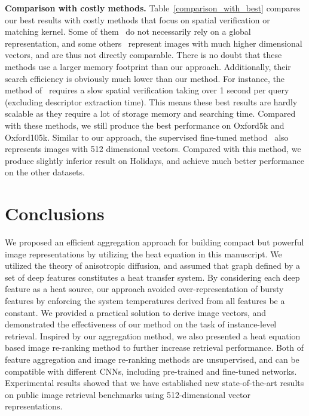 \documentclass[journal]{IEEEtran}
\begin{document}
\vspace{0.01in}
\textbf{Comparison with costly methods.}
Table~\ref{comparison_with_best} compares our best results
with costly methods that focus on spatial verification or matching kernel.
Some of them~\cite{iscen2017efficient,iscen2017fast,noh2017largescale} do not necessarily rely on a
global representation, and some others~\cite{mikulik2013learning,tolias2013aggregate,tolias2015visual, arandjelovic2016netvlad,hoang2017selective} represent images with much higher dimensional vectors, and are thus not directly comparable.
There is no doubt that these methods use a larger memory footprint than our approach.
Additionally, their search efficiency is obviously  much lower than our method.
For instance, the method of~\cite{tolias2015visual} requires a slow spatial verification taking over 1
second per query (excluding descriptor extraction time). This means these best results are  hardly scalable as they require a lot of storage memory and searching time.
Compared with these methods, we still produce the best performance on Oxford5k and Oxford105k.
Similar to our approach, the supervised fine-tuned method~\cite{gordo2016deep} also represents images with 512 dimensional vectors.
Compared with this method, we produce slightly inferior result on Holidays, and achieve much better performance on the other datasets.

\section{Conclusions}\label{sec:conclusions}
We proposed an efficient aggregation approach for building compact but powerful image representations by utilizing the heat equation in this manuscript.
We utilized the theory of anisotropic diffusion, and assumed that graph defined by a set of deep features constitutes a heat transfer system.
By considering each deep feature as a heat source, our approach avoided over-representation of bursty features by enforcing the system temperatures  derived from all features be a constant. We provided a practical solution to derive image vectors, and demonstrated the effectiveness of our method on the task of instance-level retrieval.
Inspired by our aggregation method, we also presented a heat equation based image re-ranking method to further increase retrieval performance.
Both of feature aggregation and image re-ranking methods are unsupervised, and can be compatible with different CNNs, including pre-trained and fine-tuned networks.
Experimental results showed that we have established new state-of-the-art results on public image retrieval benchmarks using 512-dimensional vector representations.
\end{document}
